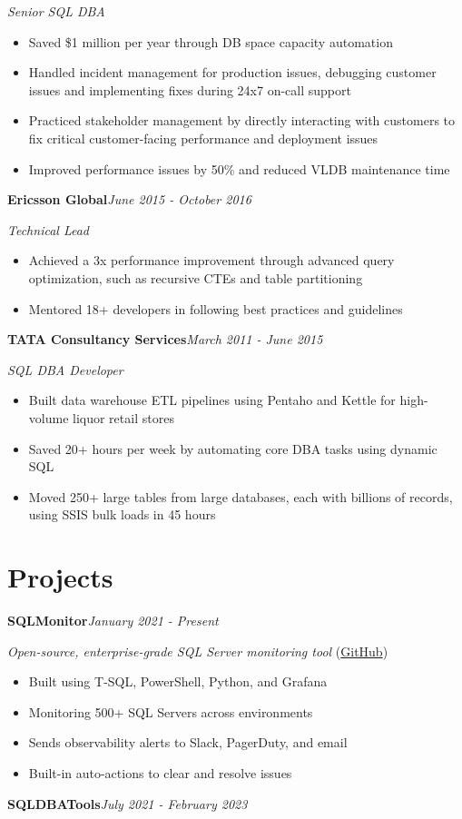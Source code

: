 \documentclass[10pt,a4paper]{article}
\begin{document}
\textit{Senior SQL DBA}\\[-5pt]
\begin{itemize}
  \item Saved \$1 million per year through DB space capacity automation
  \item Handled incident management for production issues, debugging customer issues and implementing fixes during 24x7 on-call support
  \item Practiced stakeholder management by directly interacting with customers to fix critical customer-facing performance and deployment issues
  \item Improved performance issues by 50\% and reduced VLDB maintenance time
\end{itemize}
\vspace{14.7pt}
\noindent\textbf{Ericsson Global}\hfill \textit{June 2015 - October 2016}

\textit{Technical Lead}\\[-5pt]
\begin{itemize}
  \item Achieved a 3x performance improvement through advanced query optimization, such as recursive CTEs and table partitioning
  \item Mentored 18+ developers in following best practices and guidelines
\end{itemize}
\vspace{14.7pt}
\noindent\textbf{TATA Consultancy Services}\hfill \textit{March 2011 - June 2015}

\textit{SQL DBA Developer}\\[-5pt]
\begin{itemize}
  \item Built data warehouse ETL pipelines using Pentaho and Kettle for high-volume liquor retail stores
  \item Saved 20+ hours per week by automating core DBA tasks using dynamic SQL
  \item Moved 250+ large tables from large databases, each with billions of records, using SSIS bulk loads in 45 hours
\end{itemize}

\section{Projects}

\noindent\textbf{SQLMonitor}\hfill \textit{January 2021 - Present}

\textit{Open-source, enterprise-grade SQL Server monitoring tool} (\href{https://github.com/imajaydwivedi/SQLMonitor}{GitHub})
\begin{itemize}
  \item Built using T-SQL, PowerShell, Python, and Grafana
  \item Monitoring 500+ SQL Servers across environments
  \item Sends observability alerts to Slack, PagerDuty, and email
  \item Built-in auto-actions to clear and resolve issues
\end{itemize}
\vspace{14.7pt}
\noindent\textbf{SQLDBATools}\hfill \textit{July 2021 - February 2023}
\end{document}
